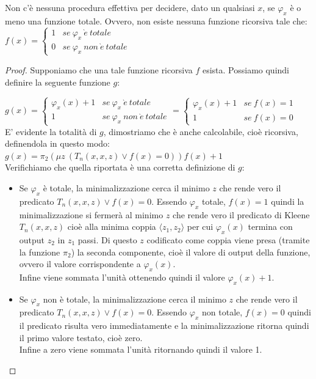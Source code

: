 \begin{thm}
  Non c'è nessuna procedura effettiva per decidere, dato un qualsiasi
  $x$, se $\varphi_{x}$ \`e o meno una funzione totale. Ovvero, non
  esiste nessuna funzione ricorsiva tale che:\\

  $f(x)=\left\{ \begin{array}{ll}
  1 & se\ \varphi_{x}\ \grave e\ totale\\
  0 & se\ \varphi_{x}\ non\ \grave e\ totale\end{array}\right.$
\end{thm}

\begin{proof}
  
  Supponiamo che una tale funzione ricorsiva $f$ esista. Possiamo quindi definire la seguente funzione $g$:

  $
    g(x)=\left\{ \begin{array}{ll}
    \varphi_x(x)+1 & se\ \varphi_{x}\ \grave e\ totale\\
    1 & se\ \varphi_{x}\ non\ \grave e\ totale\end{array}\right.
    =
    \left\{ \begin{array}{ll}
    \varphi_x(x)+1 & se\ f(x) = 1\\
    1 & se\ f(x) = 0\end{array}\right.
  $\\

  E' evidente la totalità di $g$, dimostriamo che è anche calcolabile, cioè ricorsiva, definendola in questo
  modo:\\

  $g(x) = \pi_2(\mu z\ (T_n(x,x,z) \vee f(x)=0)) f(x) + 1$\\

  Verifichiamo che quella riportata è una corretta definizione di $g$:\\
  \begin{itemize}
    \item Se $\varphi_x$ è totale, la minimalizzazione cerca il minimo $z$ che rende vero il predicato
      $T_n(x,x,z) \vee f(x)=0$. Essendo $\varphi_x$ totale, $f(x)=1$ quindi la minimalizzazione si fermerà
      al minimo $z$ che rende vero il predicato di Kleene $T_n(x,x,z)$ cioè alla minima coppia 
      $\langle z_1,z_2 \rangle$ per cui $\varphi_x(x)$ termina con output $z_2$ in $z_1$ passi.
      Di questo $z$ codificato come coppia viene presa (tramite la funzione $\pi_2$) la seconda componente,
      cioè il valore di output della funzione, ovvero il valore corrispondente a $\varphi_x(x)$.\\
      Infine viene sommata l'unità ottenendo quindi il valore $\varphi_x(x) + 1$.
    \item Se $\varphi_x$ non è totale, la minimalizzazione cerca il minimo $z$ che rende vero il predicato
      $T_n(x,x,z) \vee f(x)=0$. Essendo $\varphi_x$ non totale, $f(x)=0$ quindi il predicato risulta vero immediatamente
      e la minimalizzazione ritorna quindi il primo valore testato, cioè zero.\\
      Infine a zero viene sommata l'unità ritornando quindi il valore 1.
  \end{itemize}


\end{proof}
